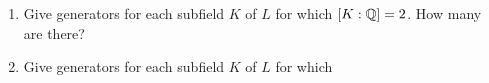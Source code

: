 \begin{problem}
\begin{enumerate}[label=(\alph*)]
\item Give generators for each subfield $K$ of $L$ for which
  $[K:\mathbb{Q}]=2$. How many are there?
\item Give generators for each subfield $K$ of $L$ for which

\end{enumerate}
\end{problem}
